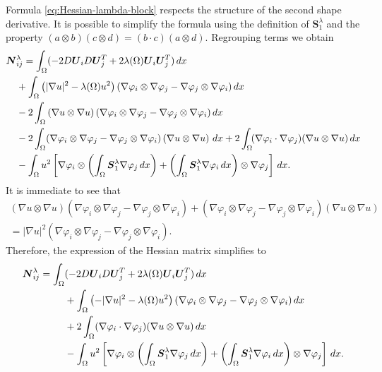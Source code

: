 \documentclass[JEP,XML,SOM,Unicode,ThmDefs,NoFloatCountersInSection,published]{cedram}
\theoremstyle{plain}
\theoremstyle{definition}
\newcommand{\bo}[1]{{\boldsymbol#1}}
\begin{document}
Formula \eqref{eq:Hessian-lambda-block} respects the structure of the second shape derivative. It is possible to simplify the formula using the definition of $\bo S_1^\lambda$ and the property $(a\otimes b)(c\otimes d) = (b\cdot c)(a\otimes d)$. Regrouping terms we obtain
\begin{align*}
\bo N&_{ij}^\lambda  = \int_\Omega (-2D \bo U_i D \bo U_j^T+ 2\lambda(\Omega) \bo U_i \bo U_j^T)\, dx \notag\\
& +\int_\Omega \left(|\nabla u|^2-\lambda(\Omega) u^2\right) (\nabla \varphi_i \otimes \nabla \varphi_j-\nabla \varphi_j \otimes \nabla \varphi_i) \, dx \notag \\
&-2\int_\Omega \left(\nabla u \otimes \nabla u\right) (\nabla \varphi_i \otimes \nabla \varphi_j-\nabla \varphi_j \otimes \nabla \varphi_i) \, dx \notag\\
&-2\int_\Omega (\nabla \varphi_i \otimes \nabla \varphi_j-\nabla \varphi_j \otimes \nabla \varphi_i)\left(\nabla u \otimes \nabla u\right) \, dx +2\int_\Omega\! (\nabla \varphi_i \cdot \nabla \varphi_j)(\nabla u \otimes \nabla u) \, dx \notag \\
& - \int_\Omega u^2\left[\nabla \varphi_i \otimes \left(\int_\Omega \bo S_1^\lambda \nabla \varphi_j \, dx\right)+
\left(\int_\Omega \bo S_1^\lambda \nabla \varphi_i \, dx\right)\otimes \nabla \varphi_j \right]\, dx.
\end{align*}
It is immediate to see that
\vspace*{-5pt}
\begin{multline*} \left(\nabla u \otimes \nabla u\right) (\nabla \varphi_i \otimes \nabla \varphi_j-\nabla \varphi_j \otimes \nabla \varphi_i)+ (\nabla \varphi_i \otimes \nabla \varphi_j-\nabla \varphi_j \otimes \nabla \varphi_i)\left(\nabla u \otimes \nabla u\right)\\
=|\nabla u|^2 (\nabla \varphi_i \otimes \nabla \varphi_j-\nabla \varphi_j \otimes \nabla \varphi_i).
\end{multline*}
Therefore, the expression of the Hessian matrix simplifies to
\begin{align}
\label{eq:Hessian-lambda-exp}
\bo N_{ij}^\lambda  = \int_\Omega& (-2D \bo U_i D \bo U_j^T+ 2\lambda(\Omega) \bo U_i \bo U_j^T)\, dx\\
& +\int_\Omega \left(-|\nabla u|^2-\lambda(\Omega) u^2\right) (\nabla \varphi_i \otimes \nabla \varphi_j-\nabla \varphi_j \otimes \nabla \varphi_i) \, dx \notag \\
& +2\int_\Omega (\nabla \varphi_i \cdot \nabla \varphi_j)(\nabla u \otimes \nabla u) \, dx \notag \\
& - \int_\Omega u^2\left[\nabla \varphi_i \otimes \left(\int_\Omega \bo S_1^\lambda \nabla \varphi_j\, dx \right)+
\left(\int_\Omega \bo S_1^\lambda \nabla \varphi_i\, dx \right)\otimes \nabla \varphi_j \right]\, dx. \notag
\end{align}
\end{document}
